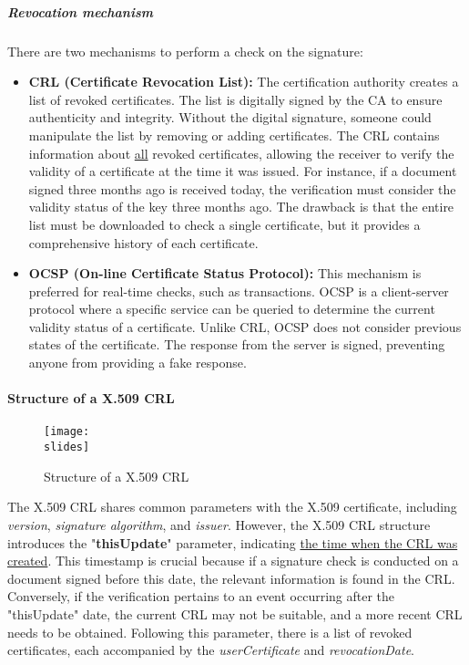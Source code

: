 \subparagraph*{Revocation mechanism}
There are two mechanisms to perform a check on the signature:

\begin{itemize}
    \item \textbf{CRL (Certificate Revocation List):} The certification authority creates a list of revoked certificates. The list is digitally signed by the CA to ensure authenticity and integrity. Without the digital signature, someone could manipulate the list by removing or adding certificates. The CRL contains information about \underline{all} revoked certificates, allowing the receiver to verify the validity of a certificate at the time it was issued. For instance, if a document signed three months ago is received today, the verification must consider the validity status of the key three months ago. The drawback is that the entire list must be downloaded to check a single certificate, but it provides a comprehensive history of each certificate.

    \item \textbf{OCSP (On-line Certificate Status Protocol):} This mechanism is preferred for real-time checks, such as transactions. OCSP is a client-server protocol where a specific service can be queried to determine the current validity status of a certificate. Unlike CRL, OCSP does not consider previous states of the certificate. The response from the server is signed, preventing anyone from providing a fake response.
\end{itemize}



\paragraph{Structure of a X.509 CRL}
\begin{figure}[h]
    \centering
    \texttt{[image: \\slides]}
    \caption{Structure of a X.509 CRL}
\end{figure}

The X.509 CRL shares common parameters with the X.509 certificate, including \textit{version}, \textit{signature algorithm}, and \textit{issuer}.
However, the X.509 CRL structure introduces the "\textbf{thisUpdate}" parameter, indicating \underline{the time when the CRL was created}. 
This timestamp is crucial because if a signature check is conducted on a document signed before this date, the relevant information is found in the CRL. Conversely, if the verification pertains to an event occurring after the "thisUpdate" date, the current CRL may not be suitable, and a more recent CRL needs to be obtained. Following this parameter, there is a list of revoked certificates, each accompanied by the \textit{userCertificate} and \textit{revocationDate}.



